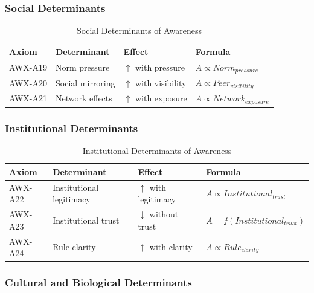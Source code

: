 \subsubsection{Social Determinants}

\begin{table}[htbp]
\centering
\caption{Social Determinants of Awareness}
\label{tab:social-determinants}
\renewcommand{\arraystretch}{1.3}
\begin{tabular}{@{}llll@{}}
\toprule
\textbf{Axiom} & \textbf{Determinant} & \textbf{Effect} & \textbf{Formula} \\
\midrule
AWX-A19 & Norm pressure & $\uparrow$ with pressure & $A \propto Norm_{pressure}$ \\
AWX-A20 & Social mirroring & $\uparrow$ with visibility & $A \propto Peer_{visibility}$ \\
AWX-A21 & Network effects & $\uparrow$ with exposure & $A \propto Network_{exposure}$ \\
\bottomrule
\end{tabular}
\end{table}

\subsubsection{Institutional Determinants}

\begin{table}[htbp]
\centering
\caption{Institutional Determinants of Awareness}
\label{tab:institutional-determinants}
\renewcommand{\arraystretch}{1.3}
\begin{tabular}{@{}llll@{}}
\toprule
\textbf{Axiom} & \textbf{Determinant} & \textbf{Effect} & \textbf{Formula} \\
\midrule
AWX-A22 & Institutional legitimacy & $\uparrow$ with legitimacy & $A \propto Institutional_{trust}$ \\
AWX-A23 & Institutional trust & $\downarrow$ without trust & $A = f(Institutional_{trust})$ \\
AWX-A24 & Rule clarity & $\uparrow$ with clarity & $A \propto Rule_{clarity}$ \\
\bottomrule
\end{tabular}
\end{table}

\subsubsection{Cultural and Biological Determinants}


